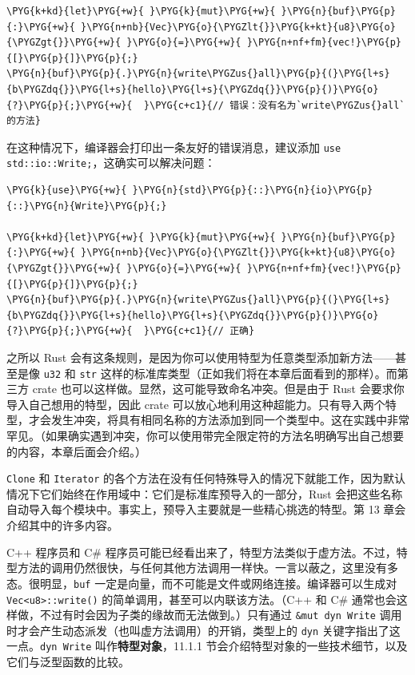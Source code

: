\begin{Verbatim}[commandchars=\\\{\},breaklines=true,breakanywhere=true,fontsize=\codefont,xleftmargin=17bp]
\PYG{k+kd}{let}\PYG{+w}{ }\PYG{k}{mut}\PYG{+w}{ }\PYG{n}{buf}\PYG{p}{:}\PYG{+w}{ }\PYG{n+nb}{Vec}\PYG{o}{\PYGZlt{}}\PYG{k+kt}{u8}\PYG{o}{\PYGZgt{}}\PYG{+w}{ }\PYG{o}{=}\PYG{+w}{ }\PYG{n+nf+fm}{vec!}\PYG{p}{[}\PYG{p}{]}\PYG{p}{;}
\PYG{n}{buf}\PYG{p}{.}\PYG{n}{write\PYGZus{}all}\PYG{p}{(}\PYG{l+s}{b\PYGZdq{}}\PYG{l+s}{hello}\PYG{l+s}{\PYGZdq{}}\PYG{p}{)}\PYG{o}{?}\PYG{p}{;}\PYG{+w}{  }\PYG{c+c1}{// 错误：没有名为`write\PYGZus{}all`的方法}
\end{Verbatim}

在这种情况下，编译器会打印出一条友好的错误消息，建议添加 \texttt{use std::io::Write;}，这确实可以解决问题：

\begin{Verbatim}[commandchars=\\\{\},breaklines=true,breakanywhere=true,fontsize=\codefont,xleftmargin=17bp]
\PYG{k}{use}\PYG{+w}{ }\PYG{n}{std}\PYG{p}{::}\PYG{n}{io}\PYG{p}{::}\PYG{n}{Write}\PYG{p}{;}

\PYG{k+kd}{let}\PYG{+w}{ }\PYG{k}{mut}\PYG{+w}{ }\PYG{n}{buf}\PYG{p}{:}\PYG{+w}{ }\PYG{n+nb}{Vec}\PYG{o}{\PYGZlt{}}\PYG{k+kt}{u8}\PYG{o}{\PYGZgt{}}\PYG{+w}{ }\PYG{o}{=}\PYG{+w}{ }\PYG{n+nf+fm}{vec!}\PYG{p}{[}\PYG{p}{]}\PYG{p}{;}
\PYG{n}{buf}\PYG{p}{.}\PYG{n}{write\PYGZus{}all}\PYG{p}{(}\PYG{l+s}{b\PYGZdq{}}\PYG{l+s}{hello}\PYG{l+s}{\PYGZdq{}}\PYG{p}{)}\PYG{o}{?}\PYG{p}{;}\PYG{+w}{  }\PYG{c+c1}{// 正确}
\end{Verbatim}

之所以 Rust 会有这条规则，是因为你可以使用特型为任意类型添加新方法——甚至是像 \texttt{u32} 和 \texttt{str} 这样的标准库类型（正如我们将在本章后面看到的那样）。而第三方 crate 也可以这样做。显然，这可能导致命名冲突。但是由于 Rust 会要求你导入自己想用的特型，因此 crate 可以放心地利用这种超能力。只有导入两个特型，才会发生冲突，将具有相同名称的方法添加到同一个类型中。这在实践中非常罕见。（如果确实遇到冲突，你可以使用带完全限定符的方法名明确写出自己想要的内容，本章后面会介绍。）

\texttt{Clone} 和 \texttt{Iterator} 的各个方法在没有任何特殊导入的情况下就能工作，因为默认情况下它们始终在作用域中：它们是标准库预导入的一部分，Rust 会把这些名称自动导入每个模块中。事实上，预导入主要就是一些精心挑选的特型。第 13 章会介绍其中的许多内容。

C++ 程序员和 C\# 程序员可能已经看出来了，特型方法类似于虚方法。不过，特型方法的调用仍然很快，与任何其他方法调用一样快。一言以蔽之，这里没有多态。很明显，\texttt{buf} 一定是向量，而不可能是文件或网络连接。编译器可以生成对 \texttt{Vec<u8>::write()} 的简单调用，甚至可以内联该方法。（C++ 和 C\# 通常也会这样做，不过有时会因为子类的缘故而无法做到。）只有通过 \texttt{\&mut dyn Write} 调用时才会产生动态派发（也叫虚方法调用）的开销，类型上的 \texttt{dyn} 关键字指出了这一点。\texttt{dyn Write} 叫作\textbf{特型对象}，11.1.1 节会介绍特型对象的一些技术细节，以及它们与泛型函数的比较。

